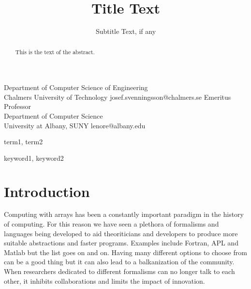 \documentclass{sigplanconf}
\begin{document}
\setlength{\pdfpageheight}{\paperheight}
\setlength{\pdfpagewidth}{\paperwidth}






\title{Title Text}
\subtitle{Subtitle Text, if any}

           {Department of Computer Science of Engineering\\Chalmers University of Technology}
           {josef.svenningsson@chalmers.se}
           {Emeritus Professor\\Department of Computer Science\\
University at Albany, SUNY}
           {lenore@albany.edu}

\maketitle

\begin{abstract}
This is the text of the abstract.
\end{abstract}


\terms
term1, term2

\keywords
keyword1, keyword2

\section{Introduction}

Computing with arrays has been a constantly important paradigm in the
history of computing. For this reason we have seen a plethora of
formalisms and languages being developed to aid theoriticians and
developers to produce more suitable abstractions and faster programs.
Examples include Fortran, APL and Matlab but the list goes on and on.
Having many different options to choose from can be a good thing but
it can also lead to a balkanization of the community. When researchers
dedicated to different formalisms can no longer talk to each other,  it
inhibits collaborations and limits the impact of innovation.
\end{document}
